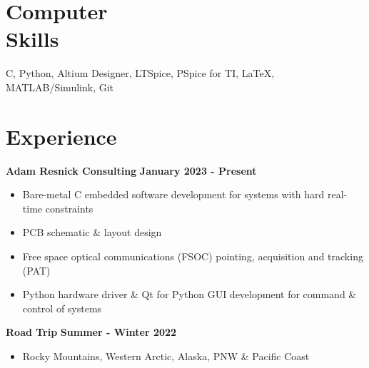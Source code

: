 \documentclass[margin,line]{resume}
\begin{document}
\begin{resume}
    \section{\mysidestyle Computer\\ Skills}

    C, Python, Altium Designer, LTSpice, PSpice for TI, \LaTeX , MATLAB/Simulink, Git


    \section{\mysidestyle Experience}

    \textbf{Adam Resnick Consulting} \hfill \textbf{January 2023 - Present}\\ \vspace{-4mm}
    \begin{itemize} \itemsep -2pt
		\item Bare-metal C embedded software development for systems with hard real-time constraints
		\item PCB schematic \& layout design
		\item Free space optical communications (FSOC) pointing, acquisition and tracking (PAT)
		\item Python hardware driver \& Qt for Python GUI development for command \& control of systems
    \end{itemize} \vspace{-2.25mm}
    
    \textbf{Road Trip} \hfill \textbf{Summer - Winter 2022}\\ \vspace{-4mm}
        \begin{itemize} \itemsep -2pt
		\item Rocky Mountains, Western Arctic, Alaska, PNW \& Pacific Coast
        \end{itemize} \vspace{-2.25mm}


\end{resume}
\end{document}
